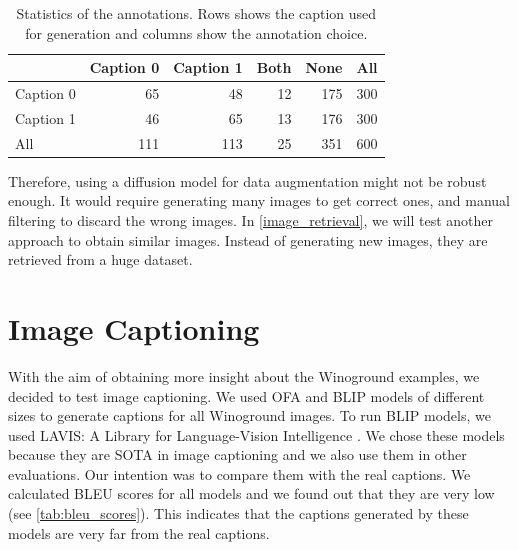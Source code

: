 \begin{table}[ht]
    \centering
    \begin{tabular}{l|rrrr|r}
    \toprule
    {} & Caption 0  &  Caption 1 &  Both &  None & All \\
    \midrule
    Caption 0    &   65 &  48 &  12 & 175 & 300\\
    Caption 1    &   46 &  65 &  13 & 176 & 300\\
    \midrule
    All  &   111 &    113 &    25 &    351 & 600\\
    \bottomrule
    \end{tabular}
    \caption{Statistics of the annotations. Rows shows the caption used for generation and columns show the annotation choice.}
    \label{tab:annotation}
\end{table}

Therefore, using a diffusion model for data augmentation might not be robust enough. It would require generating many images to get correct ones, and manual filtering to discard the wrong images. In \cref{image_retrieval}, we will test another approach to obtain similar images. Instead of generating new images, they are retrieved from a huge dataset.

\section{Image Captioning} \label{image_captioning}

With the aim of obtaining more insight about the Winoground examples, we decided to test image captioning. We used OFA \cite{wang2022unifying} and BLIP \cite{li2022blip} models of different sizes to generate captions for all Winoground images. To run BLIP models, we used LAVIS: A Library for Language-Vision Intelligence \cite{li2022lavis}. We chose these models because they are SOTA in image captioning and we also use them in other evaluations. Our intention was to compare them with the real captions. We calculated BLEU scores for all models and we found out that they are very low (see \cref{tab:bleu_scores}). This indicates that the captions generated by these models are very far from the real captions.

